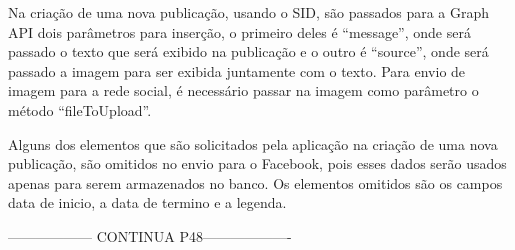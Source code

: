 Na criação de uma nova publicação, usando o SID, são passados para a Graph API dois parâmetros para inserção, o primeiro deles é “message”, onde será passado o texto que será exibido na publicação e o outro é “source”, onde será passado a imagem para ser exibida juntamente com o texto. Para envio de imagem para a rede social, é necessário passar na imagem como parâmetro o método “fileToUpload”. 

Alguns dos elementos que são solicitados pela aplicação na criação de uma nova publicação, são omitidos no envio para o Facebook, pois esses dados serão usados apenas para serem armazenados no banco. Os elementos omitidos são os campos data de inicio, a data de termino e a legenda. 

------------------ CONTINUA  P48-------------------